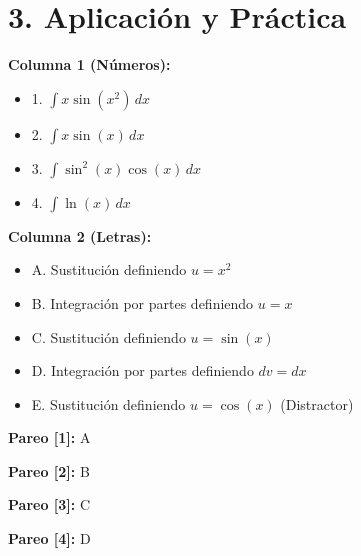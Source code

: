\documentclass[11pt]{article}
\newenvironment{aplicacion}{\section*{3. Aplicación y Práctica}}{}
\newenvironment{pareadosdoscolumnas}[1]{\begin{tcolorbox}[colback=violet!5,colframe=violet!75!black,title=Términos Pareados (2 Columnas): #1]}{\end{tcolorbox}}
\newcommand{\columnaI}[1]{\par\medskip\textbf{Columna 1 (Números):}\par\begin{itemize}#1\end{itemize}}
\newcommand{\columnaII}[1]{\par\medskip\textbf{Columna 2 (Letras):}\par\begin{itemize}#1\end{itemize}}
\newcommand{\pareo}[2]{\par\smallskip\textbf{Pareo [#1]:} #2\par}
\begin{document}
\begin{aplicacion}
  \begin{pareadosdoscolumnas}{Estrategias y Diagnóstico}
    \columnaI{
      \item 1. $\displaystyle\int x \sin(x^2) \, dx$
      \item 2. $\displaystyle\int x \sin(x) \, dx$
      \item 3. $\displaystyle\int \sin^2(x)\cos(x) \, dx$
      \item 4. $\displaystyle\int \ln(x) \, dx$
    }
    \columnaII{
      \item A. Sustitución definiendo $u = x^2$
      \item B. Integración por partes definiendo $u = x$
      \item C. Sustitución definiendo $u = \sin(x)$
      \item D. Integración por partes definiendo $dv = dx$
      \item E. Sustitución definiendo $u = \cos(x)$ (Distractor)
    }
    \pareo{1}{A}
    \pareo{2}{B}
    \pareo{3}{C}
    \pareo{4}{D}
  \end{pareadosdoscolumnas}

\end{aplicacion}
\end{document}
